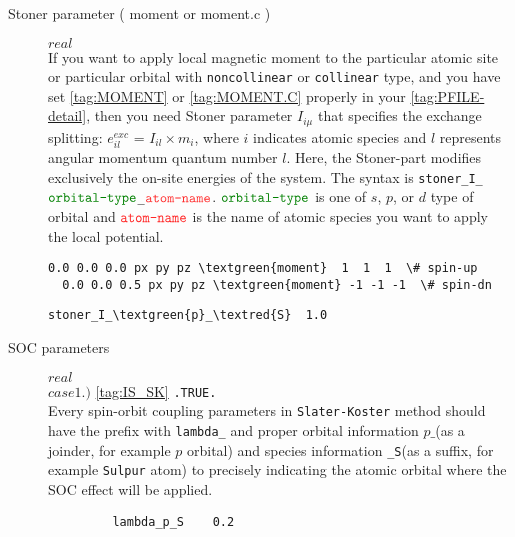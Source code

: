 \documentclass[a4paper,12pt]{scrartcl}
\makeatletter
\def\namedlabel#1#2{\begingroup
    #2%
    \def\@currentlabel{#2}%
    \phantomsection\label{#1}\endgroup
}
\newcommand{\textred}[1]{\textcolor{red!85!white}{\texttt{#1}}}
\newcommand{\textgreen}[1]{\textcolor{green!50!black}{\texttt{#1}}}
\makeatother
\begin{document}
\begin{description}
    \item[Stoner parameter (\namedlabel{tag:param-moment}{moment or moment.c})] $real$ \\
		If you want to apply local magnetic moment to the particular atomic site or
		particular orbital with \texttt{noncollinear} or \texttt{collinear} type, and you have set
		\ref{tag:MOMENT} or \ref{tag:MOMENT.C} properly in your \ref{tag:PFILE-detail}, then 
		you need Stoner parameter $I_{i\mu}$ that specifies the exchange splitting:
		$e_{il}^{exc}$ = $I_{il} \times m_i$, where $i$ indicates atomic species and $l$
		represents angular momentum quantum number $l$. 
		Here, the Stoner-part modifies exclusively the on-site energies of the system.
		The syntax is \texttt{stoner\_I\_$\textgreen{orbital-type}$\_$\textred{atom-name}$}.
		$\textgreen{orbital-type}$ is one of $s$, $p$, or $d$ type of orbital and 
		$\textred{atom-name}$ is the name of atomic species you want to apply the local
		potential.
		
\begin{Verbatim}[commandchars=\\\{\},gobble=4, frame=single, framesep=2mm, 
    label= example of \textgreen{moment} tag in \ref{tag:GFILE},
    labelposition=bottomline]
  0.0 0.0 0.0 px py pz \textgreen{moment}  1  1  1  \# spin-up
  0.0 0.0 0.5 px py pz \textgreen{moment} -1 -1 -1  \# spin-dn
\end{Verbatim}

\begin{Verbatim}[commandchars=\\\{\},gobble=4, frame=single, framesep=2mm, 
    label= example of \textgreen{stoner} parameter  in \ref{tag:PFILE},
    labelposition=bottomline]
    stoner_I_\textgreen{p}_\textred{S}  1.0
\end{Verbatim}


    \item[\namedlabel{tag:param-soc}{SOC parameters}] $real$ \\
		\subitem $case 1.)$ \ref{tag:IS_SK} \texttt{.TRUE.} \\
       	Every spin-orbit coupling parameters in \texttt{Slater-Koster} method
		should have the prefix with \texttt{lambda\_} and proper orbital information 
		\texttt{$p\_$}(as a joinder, for example $p$ orbital) 
		and species information \texttt{\_S}(as a suffix, for example 
		\texttt{Sulpur} atom) to precisely indicating the 
		atomic orbital where the SOC effect will be applied.
        \begin{verbatim}
         lambda_p_S    0.2
        \end{verbatim}


\end{description}
\end{document}
